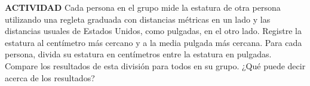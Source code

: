 \item \textbf{ACTIVIDAD} Cada persona en el grupo mide la estatura de otra persona utilizando una regleta graduada con distancias métricas en un lado y las distancias usuales de Estados Unidos, como pulgadas, en el otro lado. Registre la estatura al centímetro más cercano y a la media pulgada más cercana. Para cada persona, divida su estatura en centímetros entre la estatura en pulgadas. Compare los resultados de esta división para todos en su grupo. ¿Qué puede decir acerca de los resultados?
